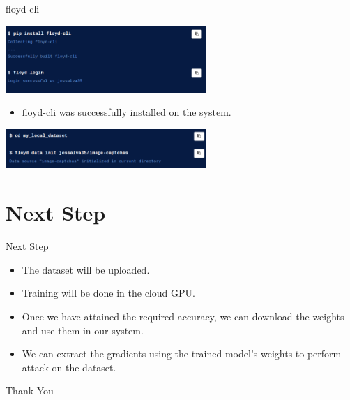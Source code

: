 \documentclass[10pt]{beamer}
\begin{document}
\begin{frame}{floyd-cli}
    
        \begin{center}
	        \includegraphics[width=3in]{FloydHub_partOne.png}
	    \end{center}
	    
    \begin{itemize}
    
        
	    \item floyd-cli was successfully installed on the system.
	    
	   
	\end{itemize}
     
	    \begin{center}
	        \includegraphics[width=3in]{FloydHubTwo.png}
	    \end{center}
	    
\end{frame}

\section{Next Step}
 \begin{frame}{Next Step}
 \begin{itemize}
     \item The dataset will be uploaded. 
     \item Training will be done in the cloud GPU.
     \item Once we have attained the required accuracy, we can download the weights and use them in our system.
     \item We can extract the gradients using the trained model's weights to perform attack on the dataset.
     \end{itemize}
 \end{frame}
\begin{frame}{}
  \centering  \Huge{Thank You}
\end{frame}
\end{document}
